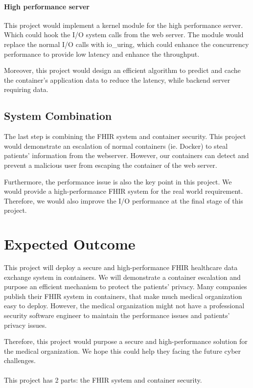 \documentclass[12pt,a4paper]{article}
\begin{document}
\paragraph{High performance server}
This project would implement a kernel module for the high performance server. Which could hook
the I/O system calls from the web server. The module would replace the normal I/O calls with
io\_uring, which could enhance the concurrency performance to provide low latency and enhance
the throughput.

Moreover, this project would design an efficient algorithm to predict and cache the container's
application data to reduce the latency, while backend server requiring data.

\subsection{System Combination}
The last step is combining the FHIR system and container security. This project would demonstrate
an escalation of normal containers (ie. Docker) to steal patients' information from the webserver.
However, our containers can detect and prevent a malicious user from escaping the container of the
web server.

Furthermore, the performance issue is also the key point in this project. We would provide a
high-performance FHIR system for the real world requirement. Therefore, we would also improve the
I/O performance at the final stage of this project.


\section{Expected Outcome}
This project will deploy a secure and high-performance FHIR healthcare data exchange system
in containers. We will demonstrate a container escalation and purpose an efficient mechanism
to protect the patients' privacy. Many companies publish their FHIR system in containers,
that make much medical organization easy to deploy. However, the medical organization might
not have a professional security software engineer to maintain the performance issues and
patients' privacy issues.

Therefore, this project would purpose a secure and high-performance solution for the medical
organization. We hope this could help they facing the future cyber challenges.
\paragraph{}
This project has 2 parts: the FHIR system and container security.
\end{document}
